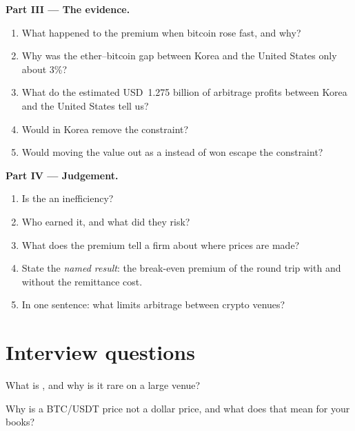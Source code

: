 \begin{problem}
\medskip\noindent\textbf{Part III --- The evidence.}
\begin{enumerate}[resume]
\item What happened to the premium when bitcoin rose fast, and why?
\item Why was the ether--bitcoin gap between Korea and the United States only about 3\%?
\item What do the estimated USD~1.275 billion of arbitrage profits between Korea and the United States tell us?
\item Would  in Korea remove the constraint?
\item Would moving the value out as a  instead of won escape the constraint?
\end{enumerate}

\medskip\noindent\textbf{Part IV --- Judgement.}
\begin{enumerate}[resume]
\item Is the  an inefficiency?
\item Who earned it, and what did they risk?
\item What does the premium tell a firm about where prices are made?
\item State the \emph{named result}: the break-even premium of the round trip with and without the remittance
cost.
\item In one sentence: what limits arbitrage between crypto venues?
\end{enumerate}
\end{problem}

\section{Interview questions}

\begin{interviewq}\label{iq:m3:spot-markets:1}
What is , and why is it rare on a large venue?
\end{interviewq}

\begin{interviewq}\label{iq:m3:spot-markets:2}
Why is a BTC/USDT price not a dollar price, and what does that mean for your books?
\end{interviewq}

